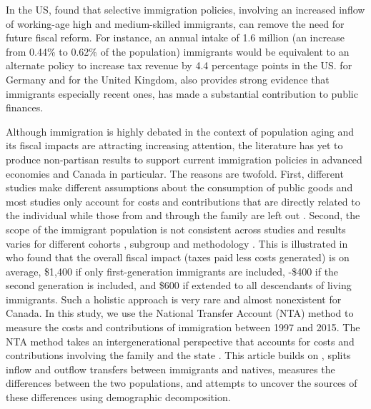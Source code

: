 \vspace{0.7em}\par
In the US, \citet{Storesletten:2000cn} found that selective immigration policies, involving an increased inflow of working-age high and medium-skilled immigrants, can remove the need for future fiscal reform.
For instance, an annual intake of 1.6 million (an increase from 0.44\% to 0.62\% of the population) immigrants would be equivalent to an alternate policy to increase tax revenue by 4.4 percentage points in the US.
\citet{Akin:2012gh} for Germany and \citet{Dustmann:2014dr} for the United Kingdom, also provides strong evidence that immigrants especially recent ones, has made a substantial contribution to public finances.

\vspace{0.7em}\par
Although immigration is highly debated in the context of population aging and its fiscal impacts are attracting increasing attention, the literature has yet to produce non-partisan results to support current immigration policies in advanced economies and Canada in particular.
The reasons are twofold.
First, different studies make different assumptions about the consumption of public goods \citep{Grubel:2012wo} and most studies only account for costs and contributions that are directly related to the individual while those from and through the family are left out \citep{dAlbis:2019de}.
Second, the scope of the immigrant population is not consistent across studies and results varies for different cohorts \citep{Grubel:2012wo}, subgroup and methodology \citep{Chojnicki:2011vu}.
This is illustrated in \citet{Lee:1998fs} who found that the overall fiscal impact (taxes paid less costs generated) is on average, \$1,400 if only first-generation immigrants are included, -\$400 if the second generation is included, and  \$600 if extended to all descendants of living immigrants.
Such a holistic approach is very rare and almost nonexistent for Canada.
In this study, we use the National Transfer Account (NTA) method to measure the costs and contributions of immigration between 1997 and 2015.
The NTA method takes an intergenerational perspective that accounts for costs and contributions involving the family and the state \citep{Mason:2011wc,UnitedNations:2013vz}.
This article builds on \citet{Merette:2019kz}, splits inflow and outflow transfers between immigrants and natives, measures the differences between the two populations, and attempts to uncover the sources of these differences using demographic decomposition.

